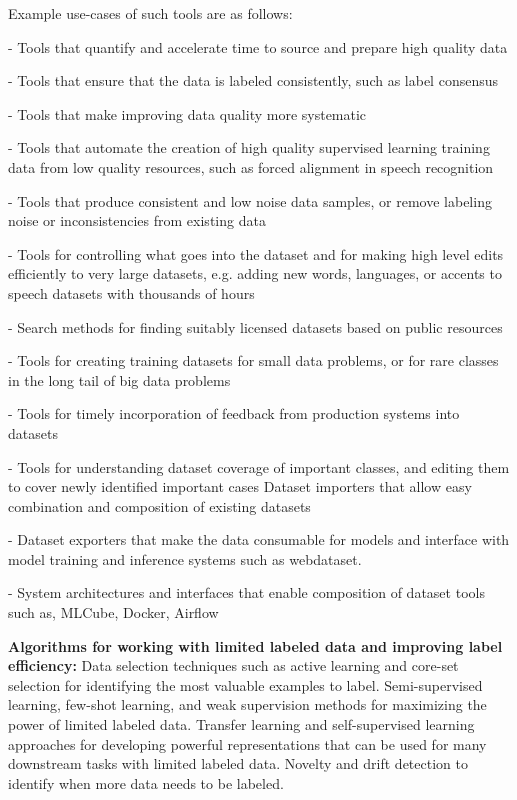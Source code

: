 \documentclass[openany]{book}
\begin{document}
Example use-cases of such tools are as follows: 

- Tools that quantify and accelerate time to source and prepare high quality data

- Tools that ensure that the data is labeled consistently, such as label consensus

- Tools that make improving data quality more systematic

- Tools that automate the creation of high quality supervised learning training data from low quality resources, such as forced alignment in speech recognition

- Tools that produce consistent and low noise data samples, or remove labeling noise or inconsistencies from existing data

- Tools for controlling what goes into the dataset and for making high level edits efficiently to very large datasets, e.g. adding new words, languages, or accents to speech datasets with thousands of hours

- Search methods for finding suitably licensed datasets based on public resources

- Tools for creating training datasets for small data problems, or for rare classes in the long tail of big data problems

- Tools for timely incorporation of feedback from production systems into datasets

- Tools for understanding dataset coverage of important classes, and editing them to cover newly identified important cases
Dataset importers that allow easy combination and composition of existing datasets

- Dataset exporters that make the data consumable for models and interface with model training and inference systems such as webdataset.

- System architectures and interfaces that enable composition of dataset tools such as, MLCube, Docker, Airflow

\textbf{Algorithms for working with limited labeled data and improving label efficiency:
}
Data selection techniques such as active learning and core-set selection for identifying the most valuable examples to label.
Semi-supervised learning, few-shot learning, and weak supervision methods for maximizing the power of limited labeled data.
Transfer learning and self-supervised learning approaches for developing powerful representations that can be used for many downstream tasks with limited labeled data.
Novelty and drift detection to identify when more data needs to be labeled.
\end{document}
